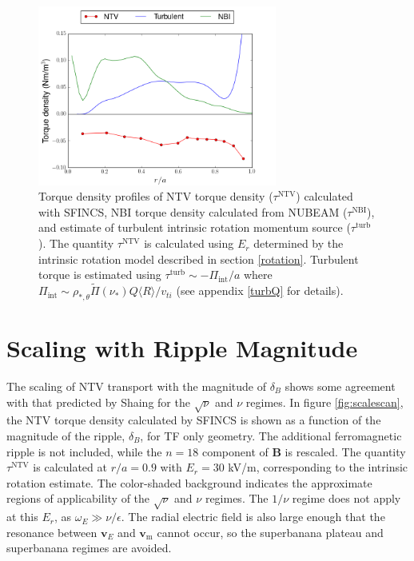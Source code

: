 \documentclass[aip, pop, preprint]{revtex4-1}
\numberwithin{figure}{section}
\numberwithin{equation}{section}
\begin{document}
\begin{figure}[h!]
\centering
\includegraphics[width=0.7\textwidth]{AllTorquePlot.png}
\caption{\label{fig:alltorque} Torque density profiles of NTV torque density ($\tau^{\text{NTV}}$) calculated with SFINCS, NBI torque density calculated from NUBEAM ($\tau^{\text{NBI}}$), and estimate of turbulent intrinsic rotation momentum source ($\tau^{\text{turb}}$). The quantity $\tau^{\text{NTV}}$ is calculated using $E_r$ determined by the intrinsic rotation model described in section \ref{rotation}. Turbulent torque is estimated using $\tau^{\text{turb}} \sim -\Pi_{\text{int}}/a$ where $\Pi_{\text{int}} \sim \rho_{*, \theta} \widetilde{\Pi}(\nu_*) Q \langle R \rangle/v_{ti}$ (see appendix \ref{turbQ} for details).}
\end{figure}

\FloatBarrier

\section{Scaling with Ripple Magnitude}\label{scaling}
The scaling of NTV transport with the magnitude of $\delta_B$ shows some agreement with that predicted by Shaing for the $\sqrt{\nu}$ and $\nu$ regimes.\cite{Shaing2008, Shaing2009} In figure \ref{fig:scalescan}, the NTV torque density calculated by SFINCS is shown as a function of the magnitude of the ripple, $\delta_B$, for TF only geometry. The additional ferromagnetic ripple is not included, while the $n= 18$ component of $\bm{B}$ is rescaled. The quantity $\tau^{\text{NTV}}$ is calculated at $r/a = 0.9$ with $E_r = 30$ kV/m, corresponding to the intrinsic rotation estimate. The color-shaded background indicates the approximate regions of applicability of the $\sqrt{\nu}$ and $\nu$ regimes. The $1/\nu$ regime does not apply at this $E_r$, as $\omega_E \gg \nu/\epsilon$.\cite{Shaing2003} The radial electric field is also large enough that the resonance between $\bm{v}_{E}$ and $\bm{v}_{\text{m}}$ cannot occur, so the superbanana plateau \cite{Shaing2009_sbp} and superbanana \cite{Shaing2009_sb} regimes are avoided. 
\end{document}
